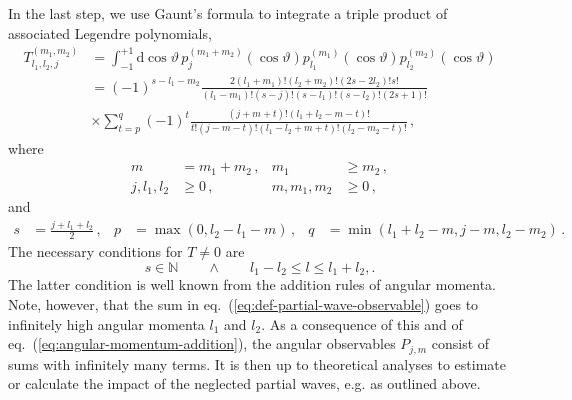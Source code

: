 \documentclass[aps,prd,reprint,nofootinbib,preprintnumbers]{revtex4}
\newcommand{\refeq}[1]{eq.~(\ref{eq:#1})}
\newcommand{\rmdx}[1]{\mbox{d} #1 \,} %
\renewcommand{\theta}{\vartheta}
\begin{document}
In the last step, we use Gaunt's formula \cite{Gaunt:1929} to integrate a triple product of associated Legendre polynomials,
\begin{equation}
\begin{aligned}
    T_{l_1,l_2,j}^{(m_1,m_2)}
        & = \int_{-1}^{+1} \rmdx{\cos\theta} p_{j}^{(m_1 + m_2)}(\cos\theta) p_{l_1}^{(m_1)}(\cos\theta) p_{l_2}^{(m_2)}(\cos\theta)\\
        & = (-1)^{s - l_1 - m_2} \frac{2 (l_1 + m_1)! (l_2 + m_2)! (2s - 2 l_2)! s!}{(l_1 - m_1)! (s - j)! (s - l_1)! (s - l_2)! (2s + 1)!}\\
        & \times \sum_{t=p}^q (-1)^t \frac{(j + m + t)!(l_1 + l_2 - m - t)!}{t! (j - m - t)! (l_1 - l_2 + m + t)! (l_2 - m_2 - t)!}\,,
\end{aligned}
\end{equation}
where
\begin{equation}
\begin{aligned}
    m & = m_1 + m_2\,, &
    m_1 & \geq m_2\,,  \\
    j, l_1, l_2 & \geq 0\,, &
    m, m_1, m_2 & \geq 0\,,
\end{aligned}
\end{equation}
and
\begin{equation}
\begin{aligned}
    s & = \frac{j + l_1 + l_2}{2}\,, &
    p & = \max(0, l_2 - l_1 - m)\,, &
    q & = \min(l_1 + l_2 - m, j - m, l_2 - m_2)\,.
\end{aligned}
\end{equation}
The necessary conditions for $T \neq 0$ are
\begin{equation}
    \label{eq:angular-momentum-addition}
    s \in \mathbb{N}\qquad \wedge \qquad l_1 - l_2 \leq l \leq l_1 + l_2,.
\end{equation}
The latter condition is well known from the addition rules of angular momenta. Note, however, that
the sum in \refeq{def-partial-wave-observable} goes to infinitely high angular momenta $l_1$ and $l_2$. As a consequence
of this and of \refeq{angular-momentum-addition}, the angular observables $P_{j,m}$
consist of sums with infinitely many terms. It is then up to theoretical analyses to
estimate or calculate the impact of the neglected partial waves, e.g. as outlined above.



\end{document}
